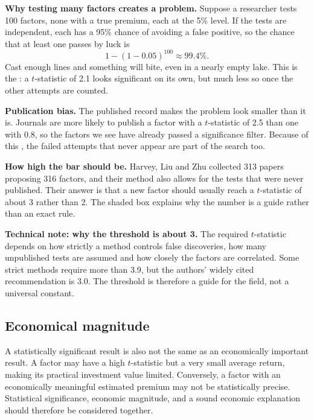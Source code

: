 \textbf{Why testing many factors creates a problem.} Suppose a researcher tests 100 factors, none with a true premium, each at the 5\% level. If the tests are independent, each has a 95\% chance of avoiding a false positive, so the chance that at least one passes by luck is
\begin{equation}
  1-(1-0.05)^{100} \approx 99.4\%. \nonumber
\end{equation}
Cast enough lines and something will bite, even in a nearly empty lake. This is the : a $t$-statistic of 2.1 looks significant on its own, but much less so once the other attempts are counted.

\textbf{Publication bias.} The published record makes the problem look smaller than it is. Journals are more likely to publish a factor with a $t$-statistic of 2.5 than one with 0.8, so the factors we see have already passed a significance filter. Because of this , the failed attempts that never appear are part of the search too.

\textbf{How high the bar should be.} Harvey, Liu and Zhu collected 313 papers proposing 316 factors, and their method also allows for the tests that were never published. Their answer is that a new factor should usually reach a $t$-statistic of about 3 rather than 2. The shaded box explains why the number is a guide rather than an exact rule.

\begin{technote}
\textbf{Technical note: why the threshold is about 3.} The required $t$-statistic depends on how strictly a method controls false discoveries, how many unpublished tests are assumed and how closely the factors are correlated. Some strict methods require more than 3.9, but the authors' widely cited recommendation is 3.0. The threshold is therefore a guide for the field, not a universal constant.
\end{technote}

\subsection{Economical magnitude}
A statistically significant result is also not the same
as an economically important result. A factor may have a
high $t$-statistic but a very small average return, making
its practical investment value limited. Conversely, a
factor with an economically meaningful estimated premium
may not be statistically precise. Statistical significance,
economic magnitude, and a sound economic explanation
should therefore be considered together.

